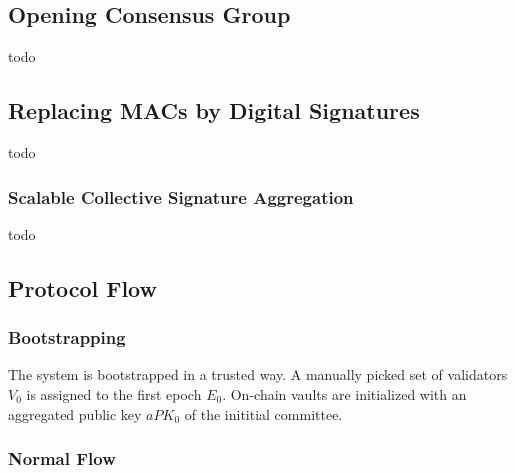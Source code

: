 \subsection{Opening Consensus Group}\label{subsec:opening-consensus-group}

todo

\subsection{Replacing MACs by Digital Signatures}\label{subsec:replacing-macs-by-digital-signatures}

todo

\subsubsection{Scalable Collective Signature Aggregation}\label{subsubsec:scalable-collective-signature-aggregation}

todo

\subsection{Protocol Flow}\label{subsec:protocol-flow}

\subsubsection{Bootstrapping}\label{subsubsec:bootstrapping}

The system is bootstrapped in a trusted way.
A manually picked set of validators $V_0$ is assigned to the first epoch $E_0$.
On-chain vaults are initialized with an aggregated public key $aPK_0$ of the inititial committee.

\subsubsection{Normal Flow}\label{subsubsec:normal-flow}

